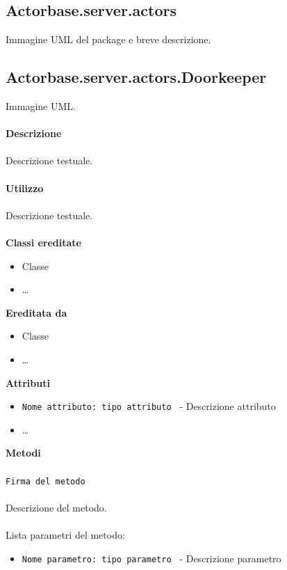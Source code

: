 \documentclass[a4paper]{article}
\begin{document}
	\subsection{Actorbase.server.actors}
		Immagine UML del package e breve descrizione.
		
	\subsection{Actorbase.server.actors.Doorkeeper}
		Immagine UML.
		\\ \\
		\textbf{Descrizione}
			\\ \\
			Descrizione testuale.
			\\ \\
		\textbf{Utilizzo}
			\\ \\
			Descrizione testuale.
			\\ \\
		\textbf{Classi ereditate}
			\begin{itemize}
				\item Classe
				\item \dots
			\end{itemize}
		\textbf{Ereditata da}
			\begin{itemize}
				\item Classe
				\item \dots
			\end{itemize}
		\textbf{Attributi}
			\begin{itemize}
				\item \texttt{Nome attributo: tipo attributo } - Descrizione attributo
				\item \dots
			\end{itemize}
		\textbf{Metodi}
			\\ \\
			\texttt{Firma del metodo}
			\\ \\
			Descrizione del metodo.
			\\ \\
			Lista parametri del metodo:
			\begin{itemize}
				\item \texttt{Nome parametro: tipo parametro } - Descrizione parametro
			\end{itemize}
			
\end{document}
